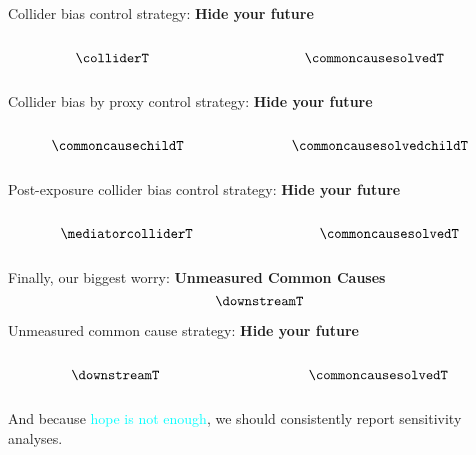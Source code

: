 \documentclass[
  ignorenonframetext,
  aspectratio=169,
  xcolor=\{dvipsnames\}]{beamer}
\begin{document}
\begin{frame}{Collider bias control strategy: \textbf{Hide your future}}
\label{collider-bias-control-strategy-hide-your-future}
\begin{columns}[T]
\begin{column}{0.5\linewidth}
\[\colliderT\]
\end{column}

\begin{column}{0.5\linewidth}
\[\commoncausesolvedT\]
\end{column}
\end{columns}
\end{frame}

\begin{frame}{Collider bias by proxy control strategy: \textbf{Hide your
future}}
\label{collider-bias-by-proxy-control-strategy-hide-your-future}
\begin{columns}[T]
\begin{column}{0.5\linewidth}
\[\commoncausechildT\]
\end{column}

\begin{column}{0.5\linewidth}
\[\commoncausesolvedchildT\]
\end{column}
\end{columns}
\end{frame}

\begin{frame}{Post-exposure collider bias control strategy: \textbf{Hide
your future}}
\label{post-exposure-collider-bias-control-strategy-hide-your-future}
\begin{columns}[T]
\begin{column}{0.5\linewidth}
\[\mediatorcolliderT\]
\end{column}

\begin{column}{0.5\linewidth}
\[\commoncausesolvedT\]
\end{column}
\end{columns}
\end{frame}

\begin{frame}{Finally, our biggest worry: \textbf{Unmeasured Common
Causes}}
\label{finally-our-biggest-worry-unmeasured-common-causes}
\[\downstreamT\]
\end{frame}

\begin{frame}{Unmeasured common cause strategy: \textbf{Hide your
future}}
\label{unmeasured-common-cause-strategy-hide-your-future}
\begin{columns}[T]
\begin{column}{0.5\linewidth}
\[\downstreamT\]
\end{column}

\begin{column}{0.5\linewidth}
\[\commoncausesolvedT\]
\end{column}
\end{columns}

And because \textcolor{cyan}{hope is not enough}, we should consistently
report sensitivity analyses.
\end{frame}
\end{document}
